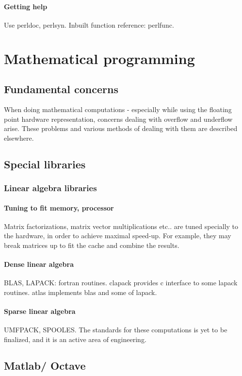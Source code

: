 \documentclass[oneside, article]{memoir}
\begin{document}
\subsection{Getting help}
Use perldoc, perlsyn. Inbuilt function reference: perlfunc.

\part{Mathematical programming}
\chapter{Fundamental concerns}
When doing mathematical computations - especially while using the floating point hardware representation, concerns dealing with overflow and underflow arise. These problems and various methods of dealing with them are described elsewhere.

\chapter{Special libraries}
\section{Linear algebra libraries}
\subsection{Tuning to fit memory, processor}
Matrix factorizations, matrix vector multiplications etc.. are tuned specially to the hardware, in order to achieve maximal speed-up. For example, they may break matrices up to fit the cache and combine the results.

\subsection{Dense linear algebra}
BLAS, LAPACK: fortran routines. clapack provides c interface to some lapack routines. atlas implements blas and some of lapack.

\subsection{Sparse linear algebra}
UMFPACK, SPOOLES. The standards for these computations is yet to be finalized, and it is an active area of engineering.

\chapter{Matlab/ Octave}
\end{document}
